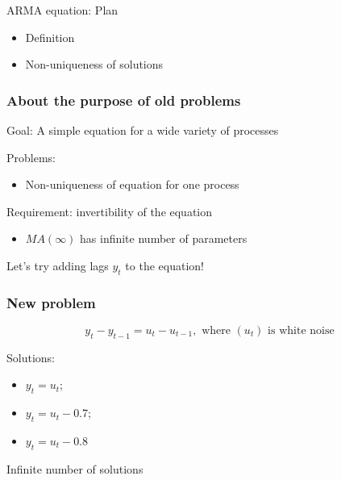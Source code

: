 
\begin{frame} %
	
	
\end{frame}



\begin{frame}{ARMA equation: Plan}
	\begin{itemize}[<+->]
		\item Definition
		\item Non-uniqueness of solutions
	\end{itemize}
		
\end{frame}

\begin{frame}
	\frametitle{About the purpose of old problems}
	
	Goal: A simple equation for a wide variety of processes
	
	\pause
	
	Problems:
	\begin{itemize}
		\item \alert{Non-uniqueness of equation} for one process
	\end{itemize}
	\pause
	
	Requirement: \alert{invertibility of the equation} \pause
	\begin{itemize}
		\item $MA(\infty)$ has \alert{infinite} number of parameters
	\end{itemize}
	
	\pause
	Let's try \alert{adding lags} $y_t$ to the equation!
	
	
\end{frame}


\begin{frame}
	\frametitle{New problem}
	
	\[
	y_t - y_{t-1} = u_t - u_{t-1}, \text{ where } (u_t) \text{ is white noise}
	\]
	
	\pause
	Solutions:
	\pause
	\begin{itemize}[<+->]
		\item $y_t = u_t$;
		\item $y_t = u_t - 0.7$;
		\item $y_t = u_t - 0.8$
	\end{itemize}
	
	\pause
	
	\alert{Infinite} number of solutions
	
\end{frame}


